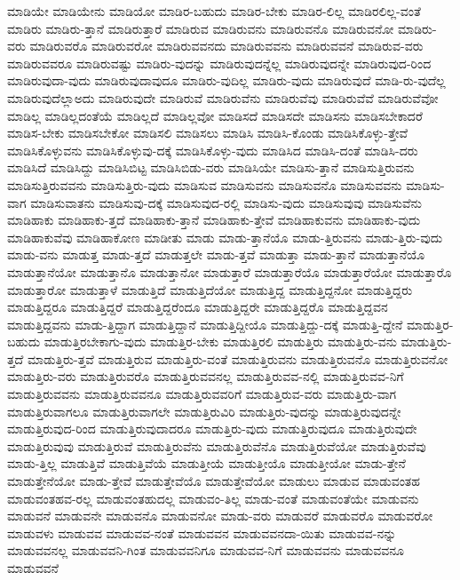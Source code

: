 {ಮಾಡಿಯೇ
ಮಾಡಿಯೇನು
ಮಾಡಿಯೋ
ಮಾಡಿರ-ಬಹುದು
ಮಾಡಿರ-ಬೇಕು
ಮಾಡಿರ-ಲಿಲ್ಲ
ಮಾಡಿರಲಿಲ್ಲ-ವಂತೆ
ಮಾಡಿರು
ಮಾಡಿರು-ತ್ತಾನೆ
ಮಾಡಿರುತ್ತಾರೆ
ಮಾಡಿರುವ
ಮಾಡಿರುವನು
ಮಾಡಿರುವನೊ
ಮಾಡಿರುವನೋ
ಮಾಡಿರು-ವರು
ಮಾಡಿರುವರೊ
ಮಾಡಿರುವರೋ
ಮಾಡಿರುವವನದು
ಮಾಡಿರುವವನು
ಮಾಡಿರುವವನೆ
ಮಾಡಿರುವ-ವರು
ಮಾಡಿರುವವರೂ
ಮಾಡಿರುವಷ್ಟು
ಮಾಡಿರು-ವುದನ್ನು
ಮಾಡಿರುವುದನ್ನೆಲ್ಲ
ಮಾಡಿರುವುದನ್ನೇ
ಮಾಡಿರುವುದ-ರಿಂದ
ಮಾಡಿರುವುದಾ-ವುದು
ಮಾಡಿರುವುದಾವುದೂ
ಮಾಡಿರು-ವುದಿಲ್ಲ
ಮಾಡಿರು-ವುದು
ಮಾಡಿರುವುದೆ
ಮಾಡಿ-ರು-ವುದೆಲ್ಲ
ಮಾಡಿರುವುದೆಲ್ಲಾಅದು
ಮಾಡಿರುವುದೇ
ಮಾಡಿರುವೆ
ಮಾಡಿರುವೆನು
ಮಾಡಿರುವೆವು
ಮಾಡಿರುವೆವೆ
ಮಾಡಿರುವೆವೋ
ಮಾಡಿಲ್ಲ
ಮಾಡಿಲ್ಲದಂತೆಯೆ
ಮಾಡಿಲ್ಲದೆ
ಮಾಡಿಲ್ಲವೋ
ಮಾಡಿಸದೆ
ಮಾಡಿಸದೇ
ಮಾಡಿಸನು
ಮಾಡಿಸಬೇಕಾದರೆ
ಮಾಡಿಸ-ಬೇಕು
ಮಾಡಿಸಬೇಕೋ
ಮಾಡಿಸಲಿ
ಮಾಡಿಸಲು
ಮಾಡಿಸಿ
ಮಾಡಿಸಿ-ಕೊಂಡು
ಮಾಡಿಸಿಕೊಳ್ಳು-ತ್ತೇವೆ
ಮಾಡಿಸಿಕೊಳ್ಳುವನು
ಮಾಡಿಸಿಕೊಳ್ಳುವು-ದಕ್ಕೆ
ಮಾಡಿಸಿಕೊಳ್ಳು-ವುದು
ಮಾಡಿಸಿದ
ಮಾಡಿಸಿ-ದಂತೆ
ಮಾಡಿಸಿ-ದರು
ಮಾಡಿಸಿದೆ
ಮಾಡಿಸಿದ್ದು
ಮಾಡಿಸಿಬಿಟ್ಟ
ಮಾಡಿಸಿಬಿಡು-ವರು
ಮಾಡಿಸಿಯೇ
ಮಾಡಿಸು-ತ್ತಾನೆ
ಮಾಡಿಸುತ್ತಿರುವನು
ಮಾಡಿಸುತ್ತಿರುವವನು
ಮಾಡಿಸುತ್ತಿರು-ವುದು
ಮಾಡಿಸುವ
ಮಾಡಿಸುವನು
ಮಾಡಿಸುವನೊ
ಮಾಡಿಸುವವನು
ಮಾಡಿಸು-ವಾಗ
ಮಾಡಿಸುವಾತನು
ಮಾಡಿಸುವು-ದಕ್ಕೆ
ಮಾಡಿಸುವುದ-ರಲ್ಲಿ
ಮಾಡಿಸು-ವುದು
ಮಾಡಿಸುವುವು
ಮಾಡಿಸುವೆನು
ಮಾಡಿಹಾಕು
ಮಾಡಿಹಾಕು-ತ್ತದೆ
ಮಾಡಿಹಾಕು-ತ್ತಾನೆ
ಮಾಡಿಹಾಕು-ತ್ತೇವೆ
ಮಾಡಿಹಾಕುವನು
ಮಾಡಿಹಾಕು-ವುದು
ಮಾಡಿಹಾಕುವೆವು
ಮಾಡಿಹಾಕೋಣ
ಮಾಡೀತು
ಮಾಡು
ಮಾಡು-ತ್ತಾನೆಯೊ
ಮಾಡು-ತ್ತಿರುವನು
ಮಾಡು-ತ್ತಿರು-ವುದು
ಮಾಡು-ವನು
ಮಾಡುತ್ತ
ಮಾಡು-ತ್ತದೆ
ಮಾಡುತ್ತಲೇ
ಮಾಡು-ತ್ತವೆ
ಮಾಡುತ್ತಾ
ಮಾಡು-ತ್ತಾನೆ
ಮಾಡುತ್ತಾನೆಯೊ
ಮಾಡುತ್ತಾನೆಯೋ
ಮಾಡುತ್ತಾನೊ
ಮಾಡುತ್ತಾನೋ
ಮಾಡುತ್ತಾರೆ
ಮಾಡುತ್ತಾರೆಯೊ
ಮಾಡುತ್ತಾರೆಯೋ
ಮಾಡುತ್ತಾರೊ
ಮಾಡುತ್ತಾರೋ
ಮಾಡುತ್ತಾಳೆ
ಮಾಡುತ್ತಿದೆ
ಮಾಡುತ್ತಿದೆಯೋ
ಮಾಡುತ್ತಿದ್ದ
ಮಾಡುತ್ತಿದ್ದನೋ
ಮಾಡುತ್ತಿದ್ದರು
ಮಾಡುತ್ತಿದ್ದರೂ
ಮಾಡುತ್ತಿದ್ದರೆ
ಮಾಡುತ್ತಿದ್ದರೆಂದೂ
ಮಾಡುತ್ತಿದ್ದರೇ
ಮಾಡುತ್ತಿದ್ದರೊ
ಮಾಡುತ್ತಿದ್ದವನ
ಮಾಡುತ್ತಿದ್ದವನು
ಮಾಡು-ತ್ತಿದ್ದಾಗ
ಮಾಡುತ್ತಿದ್ದಾನೆ
ಮಾಡುತ್ತಿದ್ದೀಯೊ
ಮಾಡುತ್ತಿದ್ದು-ದಕ್ಕೆ
ಮಾಡುತ್ತಿ-ದ್ದೇನೆ
ಮಾಡುತ್ತಿರ-ಬಹುದು
ಮಾಡುತ್ತಿರಬೇಕಾಗು-ವುದು
ಮಾಡುತ್ತಿರ-ಬೇಕು
ಮಾಡುತ್ತಿರಲಿ
ಮಾಡುತ್ತಿರು
ಮಾಡುತ್ತಿರು-ವನು
ಮಾಡುತ್ತಿರು-ತ್ತದೆ
ಮಾಡುತ್ತಿರು-ತ್ತವೆ
ಮಾಡುತ್ತಿರುವ
ಮಾಡುತ್ತಿರು-ವಂತೆ
ಮಾಡುತ್ತಿರುವನು
ಮಾಡುತ್ತಿರುವನೊ
ಮಾಡುತ್ತಿರುವನೋ
ಮಾಡುತ್ತಿರು-ವರು
ಮಾಡುತ್ತಿರುವರೊ
ಮಾಡುತ್ತಿರುವವನಲ್ಲ
ಮಾಡುತ್ತಿರುವವ-ನಲ್ಲಿ
ಮಾಡುತ್ತಿರುವವ-ನಿಗೆ
ಮಾಡುತ್ತಿರುವವನು
ಮಾಡುತ್ತಿರುವವನೂ
ಮಾಡುತ್ತಿರುವವರಿಗೆ
ಮಾಡುತ್ತಿರುವ-ವರು
ಮಾಡುತ್ತಿರು-ವಾಗ
ಮಾಡುತ್ತಿರುವಾಗಲೂ
ಮಾಡುತ್ತಿರುವಾಗಲೇ
ಮಾಡುತ್ತಿರುವಿರಿ
ಮಾಡುತ್ತಿರು-ವುದನ್ನು
ಮಾಡುತ್ತಿರುವುದನ್ನೇ
ಮಾಡುತ್ತಿರುವುದ-ರಿಂದ
ಮಾಡುತ್ತಿರುವುದಾದರೂ
ಮಾಡುತ್ತಿರು-ವುದು
ಮಾಡುತ್ತಿರುವುದೂ
ಮಾಡುತ್ತಿರುವುದೇ
ಮಾಡುತ್ತಿರುವುವು
ಮಾಡುತ್ತಿರುವೆ
ಮಾಡುತ್ತಿರುವೆನು
ಮಾಡುತ್ತಿರುವೆನೊ
ಮಾಡುತ್ತಿರುವೆಯೋ
ಮಾಡುತ್ತಿರುವೆವು
ಮಾಡು-ತ್ತಿಲ್ಲ
ಮಾಡುತ್ತಿವೆ
ಮಾಡುತ್ತಿವೆಯೆ
ಮಾಡುತ್ತೀಯೆ
ಮಾಡುತ್ತೀಯೊ
ಮಾಡುತ್ತೀಯೋ
ಮಾಡು-ತ್ತೇನೆ
ಮಾಡುತ್ತೇನೆಯೋ
ಮಾಡು-ತ್ತೇವೆ
ಮಾಡುತ್ತೇವೆಯೊ
ಮಾಡುತ್ತೇವೆಯೋ
ಮಾಡುಲು
ಮಾಡುವ
ಮಾಡುವಂತಹ
ಮಾಡುವಂತಹವ-ರಲ್ಲ
ಮಾಡುವಂತಹುದಲ್ಲ
ಮಾಡುವಂ-ತಿಲ್ಲ
ಮಾಡು-ವಂತೆ
ಮಾಡುವಂತೆಯೇ
ಮಾಡುವನು
ಮಾಡುವನೆ
ಮಾಡುವನೇ
ಮಾಡುವನೊ
ಮಾಡುವನೋ
ಮಾಡು-ವರು
ಮಾಡುವರೆ
ಮಾಡುವರೊ
ಮಾಡುವರೋ
ಮಾಡುವಳು
ಮಾಡುವವ
ಮಾಡುವವ-ನಂತೆ
ಮಾಡುವವನ
ಮಾಡುವವನದಾ-ಯಿತು
ಮಾಡುವವ-ನನ್ನು
ಮಾಡುವವನಲ್ಲ
ಮಾಡುವವನಿ-ಗಿಂತ
ಮಾಡುವವನಿಗೂ
ಮಾಡುವವ-ನಿಗೆ
ಮಾಡುವವನು
ಮಾಡುವವನೂ
ಮಾಡುವವನೆ
}
